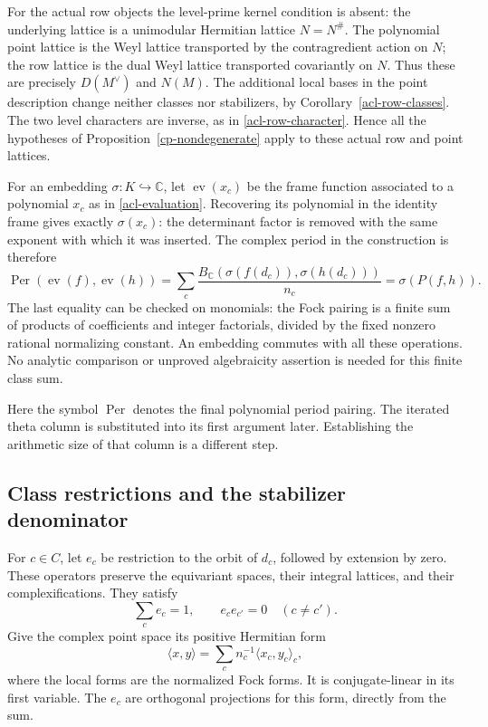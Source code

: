 For the actual row objects the level-prime kernel condition
is absent: the underlying lattice is a unimodular Hermitian
lattice $N=N^\#$. The polynomial point lattice is the Weyl
lattice transported by the contragredient action on $N$;
the row lattice is the dual Weyl lattice transported
covariantly on $N$. Thus these are precisely
$D(M^\vee)$ and $N(M)$. The additional local bases in the
point description change neither classes nor stabilizers,
by Corollary~\ref{acl-row-classes}. The two level characters
are inverse, as in \eqref{acl-row-character}. Hence all
the hypotheses of Proposition~\ref{cp-nondegenerate} apply
to these actual row and point lattices.

For an embedding $\sigma:K\hookrightarrow\mathbb C$, let
$\operatorname{ev}(x_c)$ be the frame function associated
to a polynomial $x_c$ as in \eqref{acl-evaluation}.
Recovering its polynomial in the identity frame gives
exactly $\sigma(x_c)$: the determinant factor is removed
with the same exponent with which it was inserted.
The complex period in the construction is therefore
\begin{equation}\label{cp-actual-period}
 \operatorname{Per}(\operatorname{ev}(f),\operatorname{ev}(h))
      =\sum_c\frac{B_{\mathbb C}(\sigma(f(d_c)),
                                      \sigma(h(d_c)))}{n_c}
      =\sigma(P(f,h)).
\end{equation}
The last equality can be checked on monomials: the Fock
pairing is a finite sum of products of coefficients and
integer factorials, divided by the fixed nonzero rational
normalizing constant. An embedding commutes with all these
operations. No analytic comparison or unproved algebraicity
assertion is needed for this finite class sum.

Here the symbol $\operatorname{Per}$ denotes the final
polynomial period pairing. The iterated theta column is
substituted into its first argument later. Establishing
the arithmetic size of that column is a different step.

\subsection{Class restrictions and the stabilizer denominator}

For $c\in C$, let $e_c$ be restriction to the orbit of $d_c$,
followed by extension by zero. These operators preserve the
equivariant spaces, their integral lattices, and their
complexifications. They satisfy
\[
                 \sum_c e_c=1,\qquad e_ce_{c'}=0\quad(c\ne c').
\]
Give the complex point space its positive Hermitian form
\[
                   \langle x,y\rangle
                          =\sum_c n_c^{-1}\langle x_c,y_c\rangle_c,
\]
where the local forms are the normalized Fock forms. It is
conjugate-linear in its first variable. The $e_c$ are
orthogonal projections for this form, directly from the sum.

